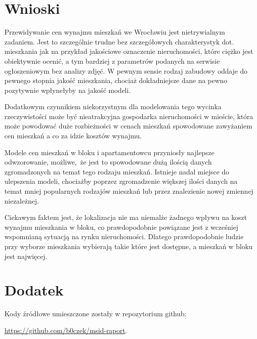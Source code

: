 \documentclass[10pt]{article}
\begin{document}
\section{Wnioski}
Przewidywanie cen wynajmu mieszkań we Wrocławiu jest nietrywialnym zadaniem.
Jest to szczególnie trudne bez szczegółowych charakterystyk dot. mieszkania jak na przykład jakościowe oznaczenie nieruchomości, 
które ciężko jest obiektywnie ocenić, a tym bardziej z parametrów podanych na serwisie ogłoszeniowym bez analizy zdjęć.
W pewnym sensie rodzaj zabudowy oddaje do pewnego stopnia jakość mieszkania, chociaż dokładniejsze dane na pewno pozytywnie wpłynełyby na jakość modeli.

Dodatkowym czynnikiem niekorzystnym dla modelowania tego wycinka rzeczywistości może być nieatrakcyjna gospodarka nieruchomości w mieście, 
która może powodować duże rozbieżności w cenach mieszkań spowodowane zawyżaniem cen mieszkań a co za idzie kosztów wynajmu.

Modele cen mieszkań w bloku i apartamentowcu przyniosły najlepsze odwzorowanie, możliwe, że jest to spowodowane dużą ilością danych zgromadzonych na temat tego rodzaju mieszkań.
Istnieje nadal miejsce do ulepszenia modeli, chociażby poprzez zgromadzenie większej ilości danych na temat mniej popularnych rodzajów mieszkań lub przez znalezienie nowej zmiennej niezależnej. 


Ciekawym faktem jest, że lokalizacja nie ma niemalże żadnego wpływu na koszt wynajmu mieszkania w bloku, 
co prawdopodobnie powiązane jest z wcześniej wspomnianą sytuacją na rynku nieruchomości.
Dlatego prawdopodobnie ludzie przy wyborze mieszkania wybierają takie które jest dostępne, a mieszkań w bloku jest najwięcej.


\newpage


\appendix
\section{Dodatek}
Kody źródłowe umieszczone zostały w repozytorium github:

\noindent \url{https://github.com/b0czek/msid-raport}.
\end{document}

